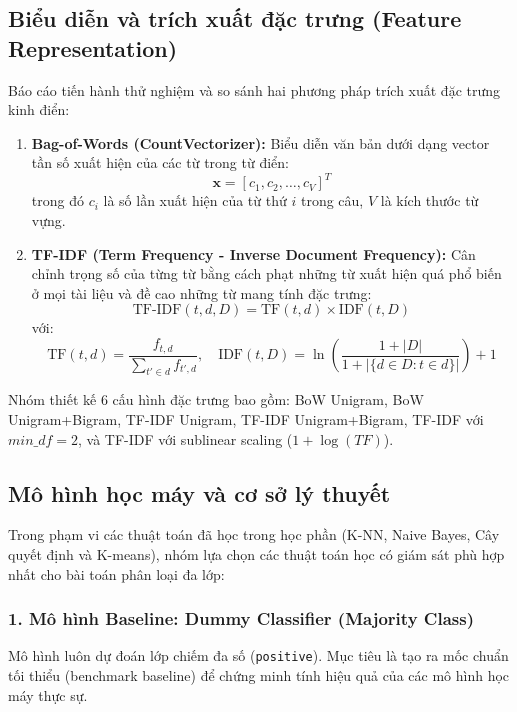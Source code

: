 \documentclass[12pt,a4paper]{article}
\begin{document}
\subsection{Biểu diễn và trích xuất đặc trưng (Feature Representation)}
Báo cáo tiến hành thử nghiệm và so sánh hai phương pháp trích xuất đặc trưng kinh điển:
\begin{enumerate}
    \item \textbf{Bag-of-Words (CountVectorizer):}
    Biểu diễn văn bản dưới dạng vector tần số xuất hiện của các từ trong từ điển:
    \begin{equation}
        \mathbf{x} = [c_1, c_2, \dots, c_V]^T
    \end{equation}
    trong đó $c_i$ là số lần xuất hiện của từ thứ $i$ trong câu, $V$ là kích thước từ vựng.
    
    \item \textbf{TF-IDF (Term Frequency - Inverse Document Frequency):}
    Cân chỉnh trọng số của từng từ bằng cách phạt những từ xuất hiện quá phổ biến ở mọi tài liệu và đề cao những từ mang tính đặc trưng:
    \begin{equation}
        \text{TF-IDF}(t, d, D) = \text{TF}(t, d) \times \text{IDF}(t, D)
    \end{equation}
    với:
    \begin{equation}
        \text{TF}(t, d) = \frac{f_{t, d}}{\sum_{t' \in d} f_{t', d}}, \quad \text{IDF}(t, D) = \ln \left( \frac{1 + |D|}{1 + |\{d \in D : t \in d\}|} \right) + 1
    \end{equation}
\end{enumerate}

Nhóm thiết kế 6 cấu hình đặc trưng bao gồm: BoW Unigram, BoW Unigram+Bigram, TF-IDF Unigram, TF-IDF Unigram+Bigram, TF-IDF với $min\_df=2$, và TF-IDF với sublinear scaling ($1 + \log(TF)$).

\subsection{Mô hình học máy và cơ sở lý thuyết}

Trong phạm vi các thuật toán đã học trong học phần (K-NN, Naive Bayes, Cây quyết định và K-means), nhóm lựa chọn các thuật toán học có giám sát phù hợp nhất cho bài toán phân loại đa lớp:

\subsubsection{1. Mô hình Baseline: Dummy Classifier (Majority Class)}
Mô hình luôn dự đoán lớp chiếm đa số (\texttt{positive}). Mục tiêu là tạo ra mốc chuẩn tối thiểu (benchmark baseline) để chứng minh tính hiệu quả của các mô hình học máy thực sự.
\end{document}
